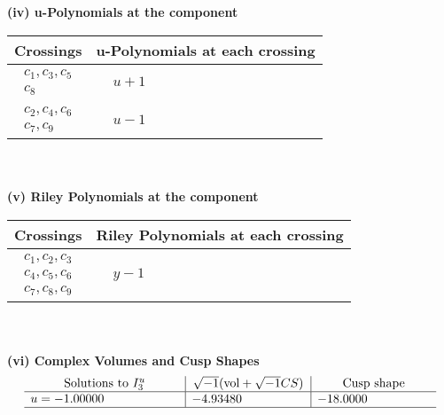 \documentclass[1p]{elsarticle_modified}
\theoremstyle{definition}
\newcommand{\I}{\sqrt{-1}}
\begin{document}
\newpage\renewcommand{\arraystretch}{1}
\flushleft \textbf{(iv) u-Polynomials at the component}\newline \\
\begin{tabular}{m{50pt}|m{274pt}}
Crossings & \hspace{64pt}u-Polynomials at each crossing \\
\hline $$\begin{aligned}c_{1},c_{3},c_{5}\\c_{8}\end{aligned}$$&$\begin{aligned}
&u+1
\end{aligned}$\\
\hline $$\begin{aligned}c_{2},c_{4},c_{6}\\c_{7},c_{9}\end{aligned}$$&$\begin{aligned}
&u-1
\end{aligned}$\\
\hline
\end{tabular}\\~\\
\newpage\renewcommand{\arraystretch}{1}
\flushleft \textbf{(v) Riley Polynomials at the component}\newline \\
\begin{tabular}{m{50pt}|m{274pt}}
Crossings & \hspace{64pt}Riley Polynomials at each crossing \\
\hline $$\begin{aligned}c_{1},c_{2},c_{3}\\c_{4},c_{5},c_{6}\\c_{7},c_{8},c_{9}\end{aligned}$$&$\begin{aligned}
&y-1
\end{aligned}$\\
\hline
\end{tabular}\\~\\
\newpage\flushleft \textbf{(vi) Complex Volumes and Cusp Shapes}
$$\begin{array}{c|c|c}  
\text{Solutions to }I^u_{3}& \I (\text{vol} + \sqrt{-1}CS) & \text{Cusp shape}\\
 \hline 
\begin{aligned}
u &= -1.00000\phantom{ +0.000000I}\end{aligned}
 & -4.93480\phantom{ +0.000000I} & -18.0000\phantom{ +0.000000I}\\
 \hline 
 \end{array}$$\newpage
\end{document}

